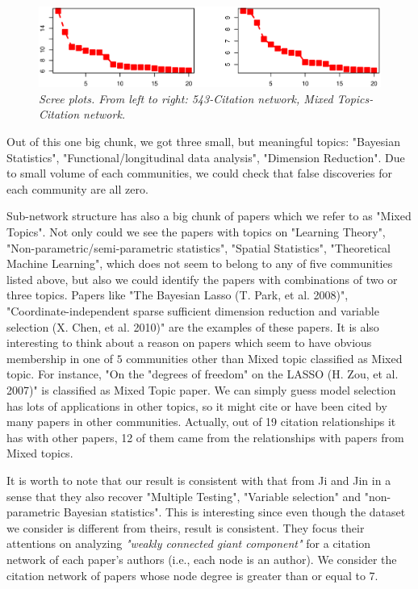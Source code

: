 \documentclass[AMS,STIX1COL]{WileyNJD-v2}
\begin{document}
\begin{figure}[htbp]
\includegraphics[width=1\textwidth]{Fig4.eps}
\caption{\it Scree plots. From left to right: 543-Citation network, Mixed Topics-Citation network.}
\label{fig:figure4}
\end{figure}

Out of this one big chunk, we got three small, but meaningful topics: "Bayesian Statistics", "Functional/longitudinal data analysis", "Dimension Reduction".
Due to small volume of each communities, we could check that false discoveries for each community are all zero.

Sub-network structure has also a big chunk of papers which we refer to as "Mixed Topics".
Not only could we see the papers with topics on "Learning Theory", "Non-parametric/semi-parametric statistics", "Spatial Statistics", "Theoretical Machine Learning", which does not seem to belong to any of five communities listed above, but also we could identify the papers with combinations of two or three topics.
Papers like "The Bayesian Lasso (T. Park, et al. 2008)", "Coordinate-independent sparse sufficient dimension reduction and variable selection (X. Chen, et al. 2010)" are the examples of these papers.
It is also interesting to think about a reason on papers which seem to have obvious membership in one of $5$ communities other than Mixed topic classified as Mixed topic.
For instance, "On the "degrees of freedom" on the LASSO (H. Zou, et al. 2007)" is classified as Mixed Topic paper.
We can simply guess model selection has lots of applications in other topics, so it might cite or have been cited by many papers in other communities.
Actually, out of 19 citation relationships it has with other papers, 12 of them came from the relationships with papers from Mixed topics. 

It is worth to note that our result is consistent with that from Ji and Jin in a sense that they also recover "Multiple Testing", "Variable selection" and "non-parametric Bayesian statistics".
This is interesting since even though the dataset we consider is different from theirs, result is consistent.
They focus their attentions on analyzing \emph{"weakly connected giant component"} for a citation network of each paper's authors ({i.e., each node is an author}).
We consider the citation network of papers whose node degree is greater than or equal to 7.
\end{document}
